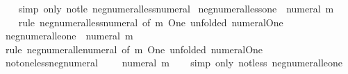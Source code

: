 \begin{isabellebody}
%
\isadelimproof
\ \ %
\endisadelimproof
%
\isatagproof
{}\isamarkupfalse%
\ {\isacharparenleft}{\kern0pt}simp\ only{\isacharcolon}{\kern0pt}\ not{\isacharunderscore}{\kern0pt}le\ neg{\isacharunderscore}{\kern0pt}numeral{\isacharunderscore}{\kern0pt}less{\isacharunderscore}{\kern0pt}numeral{\isacharparenright}{\kern0pt}%
\endisatagproof
{\isafoldproof}%
%
\isadelimproof
\isanewline
%
\endisadelimproof
\isanewline
{}\isamarkupfalse%
\ neg{\isacharunderscore}{\kern0pt}numeral{\isacharunderscore}{\kern0pt}less{\isacharunderscore}{\kern0pt}one{\isacharcolon}{\kern0pt}\ {\isachardoublequoteopen}{\isacharminus}{\kern0pt}\ numeral\ m\ {\isacharless}{\kern0pt}\ {}{\isachardoublequoteclose}\isanewline
%
\isadelimproof
\ \ %
\endisadelimproof
%
\isatagproof
{}\isamarkupfalse%
\ {\isacharparenleft}{\kern0pt}rule\ neg{\isacharunderscore}{\kern0pt}numeral{\isacharunderscore}{\kern0pt}less{\isacharunderscore}{\kern0pt}numeral\ {\isacharbrackleft}{\kern0pt}of\ m\ One{\isacharcomma}{\kern0pt}\ unfolded\ numeral{\isacharunderscore}{\kern0pt}One{\isacharbrackright}{\kern0pt}{\isacharparenright}{\kern0pt}%
\endisatagproof
{\isafoldproof}%
%
\isadelimproof
\isanewline
%
\endisadelimproof
\isanewline
{}\isamarkupfalse%
\ neg{\isacharunderscore}{\kern0pt}numeral{\isacharunderscore}{\kern0pt}le{\isacharunderscore}{\kern0pt}one{\isacharcolon}{\kern0pt}\ {\isachardoublequoteopen}{\isacharminus}{\kern0pt}\ numeral\ m\ {\isasymle}\ {}{\isachardoublequoteclose}\isanewline
%
\isadelimproof
\ \ %
\endisadelimproof
%
\isatagproof
{}\isamarkupfalse%
\ {\isacharparenleft}{\kern0pt}rule\ neg{\isacharunderscore}{\kern0pt}numeral{\isacharunderscore}{\kern0pt}le{\isacharunderscore}{\kern0pt}numeral\ {\isacharbrackleft}{\kern0pt}of\ m\ One{\isacharcomma}{\kern0pt}\ unfolded\ numeral{\isacharunderscore}{\kern0pt}One{\isacharbrackright}{\kern0pt}{\isacharparenright}{\kern0pt}%
\endisatagproof
{\isafoldproof}%
%
\isadelimproof
\isanewline
%
\endisadelimproof
\isanewline
{}\isamarkupfalse%
\ not{\isacharunderscore}{\kern0pt}one{\isacharunderscore}{\kern0pt}less{\isacharunderscore}{\kern0pt}neg{\isacharunderscore}{\kern0pt}numeral{\isacharcolon}{\kern0pt}\ {\isachardoublequoteopen}{\isasymnot}\ {}\ {\isacharless}{\kern0pt}\ {\isacharminus}{\kern0pt}\ numeral\ m{\isachardoublequoteclose}\isanewline
%
\isadelimproof
\ \ %
\endisadelimproof
%
\isatagproof
{}\isamarkupfalse%
\ {\isacharparenleft}{\kern0pt}simp\ only{\isacharcolon}{\kern0pt}\ not{\isacharunderscore}{\kern0pt}less\ neg{\isacharunderscore}{\kern0pt}numeral{\isacharunderscore}{\kern0pt}le{\isacharunderscore}{\kern0pt}one{\isacharparenright}{\kern0pt}%

\end{isabellebody}

